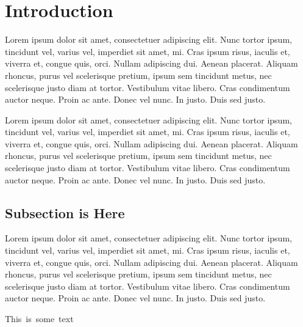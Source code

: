 \section{Introduction}

Lorem ipsum dolor sit amet, consectetuer adipiscing elit. Nunc tortor ipsum, tincidunt vel, varius vel, imperdiet sit amet, mi. Cras ipsum risus, iaculis et, viverra et, congue quis, orci. Nullam adipiscing dui. Aenean placerat. Aliquam rhoncus, purus vel scelerisque pretium, ipsum sem tincidunt metus, nec scelerisque justo diam at tortor. Vestibulum vitae libero. Cras condimentum auctor neque. Proin ac ante. Donec vel nunc. In justo. Duis sed justo.

Lorem ipsum dolor sit amet, consectetuer adipiscing elit. Nunc tortor ipsum, tincidunt vel, varius vel, imperdiet sit amet, mi. Cras ipsum risus, iaculis et, viverra et, congue quis, orci. Nullam adipiscing dui. Aenean placerat. Aliquam rhoncus, purus vel scelerisque pretium, ipsum sem tincidunt metus, nec scelerisque justo diam at tortor. Vestibulum vitae libero. Cras condimentum auctor neque. Proin ac ante. Donec vel nunc. In justo. Duis sed justo.
\subsection{Subsection is Here}
Lorem ipsum dolor sit amet, consectetuer adipiscing elit. Nunc tortor ipsum, tincidunt vel, varius vel, imperdiet sit amet, mi. Cras ipsum risus, iaculis et, viverra et, congue quis, orci. Nullam adipiscing dui. Aenean placerat. Aliquam rhoncus, purus vel scelerisque pretium, ipsum sem tincidunt metus, nec scelerisque justo diam at tortor. Vestibulum vitae libero. Cras condimentum auctor neque. Proin ac ante. Donec vel nunc. In justo. Duis sed justo.


\mbox{This is some text}
